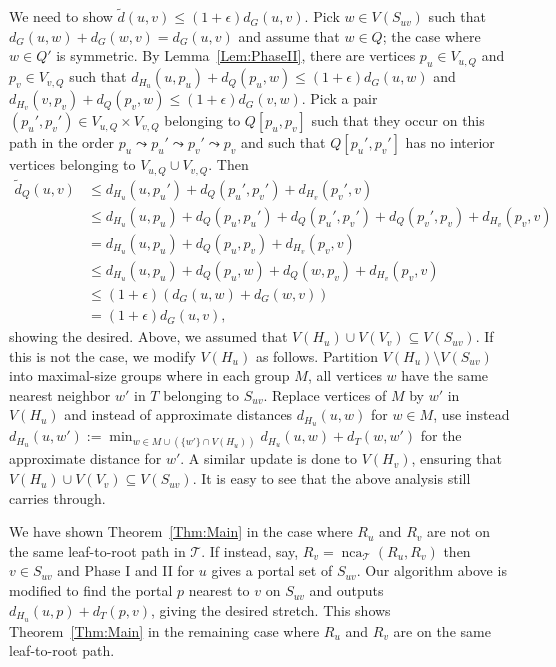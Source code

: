 \documentclass[11pt]{article}
\def\nca{\operatorname{nca}}
\begin{document}
We need to show $\tilde{d}(u,v)\leq (1+\epsilon)d_G(u,v)$. Pick $w\in V(S_{uv})$ such that $d_G(u,w) + d_G(w,v) = d_G(u,v)$ and assume that $w\in Q$; the case where $w\in Q'$ is symmetric. By Lemma~\ref{Lem:PhaseII}, there are vertices $p_u\in V_{u,Q}$ and $p_v\in V_{v,Q}$ such that $d_{H_u}(u,p_u) + d_Q(p_u,w) \leq (1+\epsilon)d_G(u,w)$ and $d_{H_v}(v,p_v) + d_Q(p_v,w)\leq (1+\epsilon)d_G(v,w)$. Pick a pair $(p_u',p_v')\in V_{u,Q}\times V_{v,Q}$ belonging to $Q[p_u,p_v]$ such that they occur on this path in the order $p_u\leadsto p_u'\leadsto p_v'\leadsto p_v$ and such that $Q[p_u',p_v']$ has no interior vertices belonging to $V_{u,Q}\cup V_{v,Q}$. Then
\begin{align*}
\tilde{d}_Q(u,v) & \leq d_{H_u}(u,p_u') + d_Q(p_u',p_v') + d_{H_v}(p_v',v)\\
                 & \leq d_{H_u}(u,p_u) + d_Q(p_u,p_u') + d_Q(p_u',p_v') + d_Q(p_v',p_v) + d_{H_v}(p_v,v)\\
                 & =    d_{H_u}(u,p_u) + d_Q(p_u,p_v) + d_{H_v}(p_v,v)\\
                 & \leq d_{H_u}(u,p_u) + d_Q(p_u,w) + d_Q(w,p_v) + d_{H_v}(p_v,v)\\
                 & \leq (1+\epsilon)(d_G(u,w) + d_G(w,v))\\
                 & =    (1+\epsilon)d_G(u,v),
\end{align*}
showing the desired. Above, we assumed that $V(H_u)\cup V(V_v)\subseteq V(S_{uv})$. If this is not the case, we modify $V(H_u)$ as follows. Partition $V(H_u)\setminus V(S_{uv})$ into maximal-size groups where in each group $M$, all vertices $w$ have the same nearest neighbor $w'$ in $T$ belonging to $S_{uv}$. Replace vertices of $M$ by $w'$ in $V(H_u)$ and instead of approximate distances $d_{H_u}(u,w)$ for $w\in M$, use instead $d_{H_u}(u,w') := \min_{w\in M\cup(\{w'\}\cap V(H_u))} d_{H_u}(u,w) + d_T(w,w')$ for the approximate distance for $w'$. A similar update is done to $V(H_v)$, ensuring that $V(H_u)\cup V(V_v)\subseteq V(S_{uv})$. It is easy to see that the above analysis still carries through.

We have shown Theorem~\ref{Thm:Main} in the case where $R_u$ and $R_v$ are not on the same leaf-to-root path in $\mathcal T$. If instead, say, $R_v = \nca_{\mathcal T}(R_u,R_v)$ then $v\in S_{uv}$ and Phase I and II for $u$ gives a portal set of $S_{uv}$. Our algorithm above is modified to find the portal $p$ nearest to $v$ on $S_{uv}$ and outputs $d_{H_u}(u,p) + d_T(p,v)$, giving the desired stretch. This shows Theorem~\ref{Thm:Main} in the remaining case where $R_u$ and $R_v$ are on the same leaf-to-root path.
\end{document}
